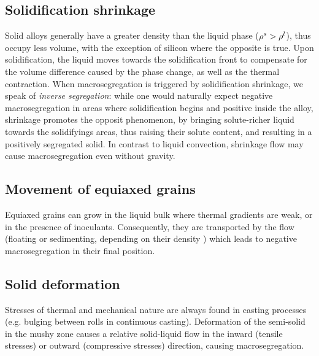 \subsection{Solidification shrinkage}
Solid alloys generally have a greater density than the liquid phase ($\rho^s > \rho^l$), 
thus occupy less volume, with the exception of silicon where the opposite is true. 
Upon solidification, the liquid moves towards the solidification front to compensate for the volume 
difference caused by the phase change, as well as the thermal contraction. When macrosegregation is 
triggered by solidification shrinkage, we speak of \emph{inverse segregation}: while one would naturally expect 
negative macrosegregation in areas where solidification begins and positive inside the alloy, shrinkage 
promotes the opposit phenomenon, by bringing solute-richer liquid towards the solidifyings areas, thus raising 
their solute content, and resulting in a positively segregated solid.
In contrast to liquid convection, shrinkage flow may cause macrosegregation even without gravity.
%
%
\subsection{Movement of equiaxed grains}
%
Equiaxed grains can grow in the liquid bulk where thermal gradients are weak, or in the presence of inoculants. 
Consequently, they are transported by the flow (floating or sedimenting, depending on their density 
\citep{beckermann_modelling_2002}) which leads to negative macrosegregation in their final position.
%
%
\subsection{Solid deformation} 
%
Stresses of thermal and mechanical nature are always found in casting processes 
(e.g. bulging between rolls in continuous casting). 
Deformation of the semi-solid in the mushy zone causes a relative solid-liquid 
flow in the inward (tensile stresses) or outward (compressive stresses) direction, causing macrosegregation.
%
